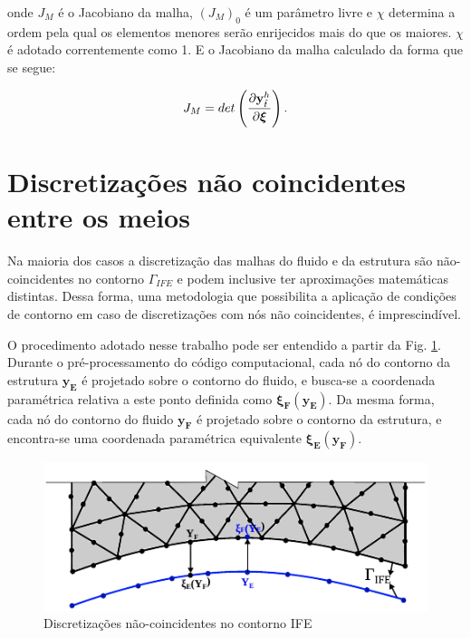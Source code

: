 \documentclass[tese_patricia]{subfiles}
\begin{document}
\noindent onde $J_M$ é o Jacobiano da malha, $(J_M)_0$ é um parâmetro livre e $\chi$ determina a ordem pela qual os elementos menores serão enrijecidos mais do que os maiores.  $\chi$ é adotado correntemente como 1. E o Jacobiano da malha calculado da forma que se segue:

\begin{align}
	J_M = det\left(\frac{\partial\mathbf{y}^h_{\tilde{t}}}{\partial\boldsymbol{\xi}}\right).
	\label{eq:3}
\end{align}



\section{Discretizações não coincidentes entre os meios}

Na maioria dos casos a discretização das malhas do fluido e da estrutura são não-coincidentes no contorno $\Gamma_{IFE}$ e podem inclusive ter aproximações matemáticas distintas. Dessa forma, uma metodologia que possibilita a aplicação de condições de contorno em caso de discretizações com nós não coincidentes, é imprescindível. 

O procedimento adotado nesse trabalho pode ser entendido a partir da Fig. \ref{fig:contornoIFE}. Durante o pré-processamento do código computacional, cada nó do contorno da estrutura $\mathbf{y_E}$ é projetado sobre o contorno do fluido, e busca-se a coordenada paramétrica relativa a este ponto definida como $\boldsymbol{\xi_{F}}(\mathbf{y_E})$. Da mesma forma, cada nó do contorno do fluido $\mathbf{y_F}$ é projetado sobre o contorno da estrutura, e encontra-se uma coordenada paramétrica equivalente $\boldsymbol{\xi_{E}}(\mathbf{y_F})$. 


\begin{figure}[htb!]
	\centering 
	\includegraphics[scale=1.5,trim=0cm 0cm 0cm 0cm, clip=true]{Imagens/Cap7/contornoIFE.pdf}	
	\caption{Discretizações não-coincidentes no contorno IFE}
	\label{fig:contornoIFE}
\end{figure}
\end{document}
